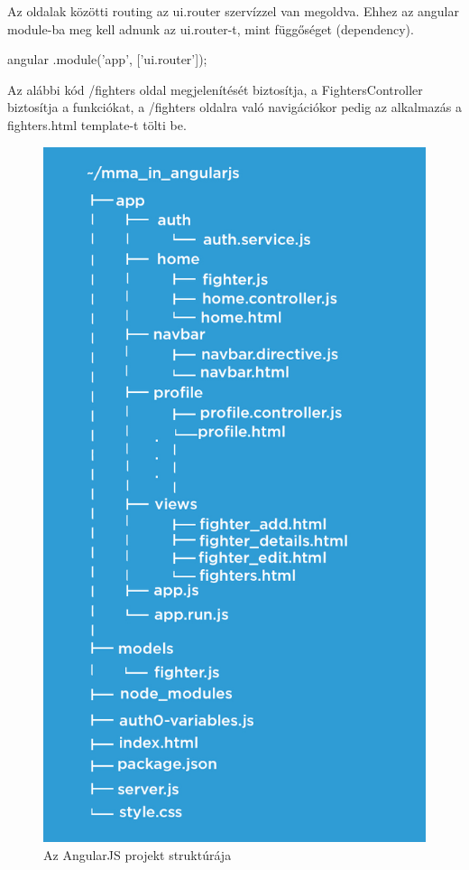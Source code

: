 Az oldalak közötti routing az ui.router szervízzel van megoldva.
Ehhez az angular module-ba meg kell adnunk az ui.router-t, mint függőséget (dependency).

\begin{cpp}
angular
    .module('app', ['ui.router']);
\end{cpp}

Az alábbi kód /fighters oldal megjelenítését biztosítja, a FightersController biztosítja a funkciókat, a /fighters oldalra való navigációkor pedig az alkalmazás a fighters.html template-t tölti be.



\begin{figure}[htb]
\centering
\includegraphics[scale=0.8]{kepek/mma_in_angularjs.jpeg}
\caption{Az AngularJS projekt struktúrája}
\label{fig:angularjs_structure}
\end{figure}
